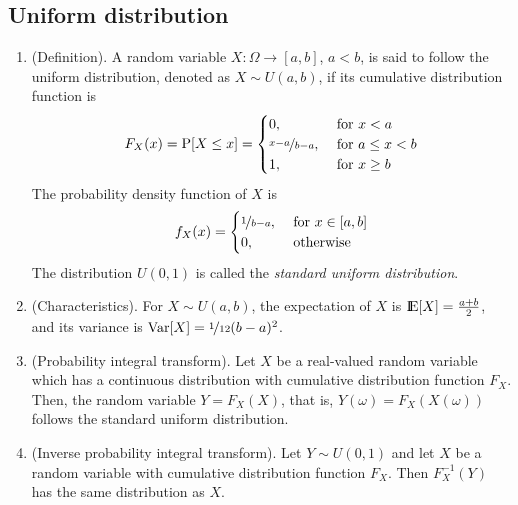 \documentclass[a4paper,10pt]{scrbook}
\begin{document}
\subsection{Uniform distribution}
\begin{enumerate}
 \item (Definition). A random variable \(X:\Omega\to[a,b]\), \(a<b\), is said to follow the 
       uniform distribution, denoted as \(X\sim U(a,b)\), if its cumulative distribution 
       function is
       \[
        F_X(x) = \mathrm{P}[X \leq x] = \begin{cases}
                                    0,&\text{ for } x<a\\
                                    \nicefrac{x-a}{b-a},&\text{ for } a \leq x < b\\
                                    1,&\text{ for } x\geq b\\
                                   \end{cases}
       \]
       The probability density function of \(X\) is
       \[
        f_X(x) = \begin{cases}
                  \nicefrac{1}{b-a},&\text{ for } x\in [a,b]\\
                  0,&\text{ otherwise}
                 \end{cases}
       \]
       The distribution \(U(0,1)\) is called the \textit{standard uniform distribution}.
 \item (Characteristics). For \(X\sim U(a,b)\), the expectation of \(X\) is \(\E[X] = \frac{a+b}{2}\), 
       and its variance is \(\mathrm{Var}[X] = \nicefrac{1}{12}(b-a)^2\).
 \item (Probability integral transform). Let \(X\) be a real-valued random variable which has 
       a continuous distribution with cumulative distribution function \(F_X\). Then, the random 
       variable \(Y = F_X(X)\), that is, \(Y(\omega) = F_X(X(\omega))\) follows the standard 
       uniform distribution.
 \item (Inverse probability integral transform). Let \(Y\sim U(0,1)\) and let \(X\) be a 
       random variable with cumulative distribution function \(F_X\). Then \(F_X^{-1}(Y)\) 
       has the same distribution as \(X\).
\end{enumerate}
\end{document}
